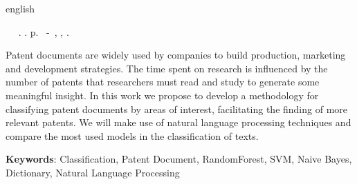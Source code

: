 \begin{resumo}[Abstract]
 \begin{otherlanguage*}{english}
	\begin{flushleft} 
		\setlength{\absparsep}{0pt} %
 		\SingleSpacing 
 		\imprimirautorabr~ ~\textbf{\imprimirtitleabstract}.	\imprimirdata.  \pageref{LastPage}p. 
		\imprimirtipotrabalho~-~\imprimirinstituicao, \imprimirlocal, 	\imprimirdata. 
 	\end{flushleft}
	\OnehalfSpacing 
   Patent documents are widely used by companies to build production, marketing and development strategies. The time spent on research is influenced by the number of patents that researchers must read and study to generate some meaningful insight. In this work we propose to develop a methodology for classifying patent documents by areas of interest, facilitating the finding of more relevant patents. We will make use of natural language processing techniques and compare the most used models in the classification of texts.

   \vspace{\onelineskip}
 
   \noindent 
   \textbf{Keywords}: Classification, Patent Document, RandomForest, SVM, Naive Bayes, Dictionary, Natural Language Processing
 \end{otherlanguage*}
\end{resumo}
